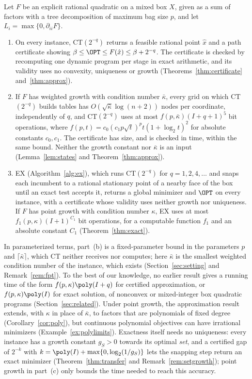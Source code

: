 \begin{theorem}\label{thm:intro-main}
Let $F$ be an explicit rational quadratic on a mixed box $X$, given as a sum
of factors with a tree decomposition of maximum bag size $p$, and let
$L_i=\max\{0,\partial_{ii}F\}$.
\begin{enumerate}[label=(\alph*)]
\item On every instance, CT$(2^{-q})$ returns a feasible rational point $\hat
x$ and a path certificate showing $\beta\le\OPT\le F(\hat x)\le\beta+2^{-q}$.
The certificate is checked by recomputing one dynamic program per stage in
exact arithmetic, and its validity uses no convexity, uniqueness or growth
(Theorems~\ref{thm:certificate} and~\ref{thm:approx}).
\item If $F$ has weighted growth with condition number $\bar\kappa$, every grid
on which CT$(2^{-q})$ builds tables has $O(\sqrt{\bar\kappa}\log(n+2))$ nodes per
coordinate, independently of $q$, and CT$(2^{-q})$ uses at most
$f(p,\bar\kappa)(I+q+1)^5$ bit operations, where
$f(p,t)=c_0(c_1p\sqrt t)^pt(1+\log_2t)^2$ for absolute
constants $c_0,c_1$. The certificate has size, and is checked in time, within
the same bound. Neither the growth constant nor $\bar\kappa$ is an input
(Lemma~\ref{lem:states} and Theorem~\ref{thm:approx}).
\item EX (Algorithm~\ref{alg:ex}), which runs CT$(2^{-q})$ for
$q=1,2,4,\dots$ and snaps each incumbent to a rational stationary point of a
nearby face of the box until an exact test accepts it, returns a global
minimizer and $\OPT$ on every instance, with a certificate
whose validity uses neither growth nor uniqueness. If $F$ has point growth
with condition number $\kappa$, EX uses at most $f_1(p,\kappa)(I+1)^{C_1}$
bit operations, for a computable function $f_1$ and an absolute constant
$C_1$ (Theorem~\ref{thm:exact}).
\end{enumerate}
\end{theorem}

In parameterized terms, part~(b) is a fixed-parameter bound in the
parameters $p$ and $\lceil\bar\kappa\rceil$, which CT neither receives nor
computes; here $\bar\kappa$ is the smallest weighted condition number of the
instance, which exists (Section~\ref{sec:setting} and
Remark~\ref{rem:fpt}). To the best of our knowledge, no earlier result gives
a running time of the form $f(p,\kappa)\poly(I+q)$ for certified approximation, or
$f(p,\kappa)\poly(I)$ for exact solution, of nonconvex or mixed-integer box
quadratic programs (Section~\ref{sec:related}). Under point growth, the
approximation result extends, with $\kappa$ in place of $\bar\kappa$, to
factors that are polynomials of fixed degree (Corollary~\ref{cor:poly}), but
continuous polynomial objectives can have irrational minimizers
(Example~\ref{ex:polylimits}).
Exactness itself needs no uniqueness: every instance has a growth constant
$g_S>0$ towards its optimal \emph{set}, and a certified gap of $2^{-k}$ with
$k=\poly(I)+\max\{0,\log_2(1/g_S)\}$ lets the snapping step return an
exact minimizer (Theorem~\ref{thm:transfer} and
Remark~\ref{rem:setgrowth}); point growth in part~(c) only bounds the time
needed to reach this accuracy.

